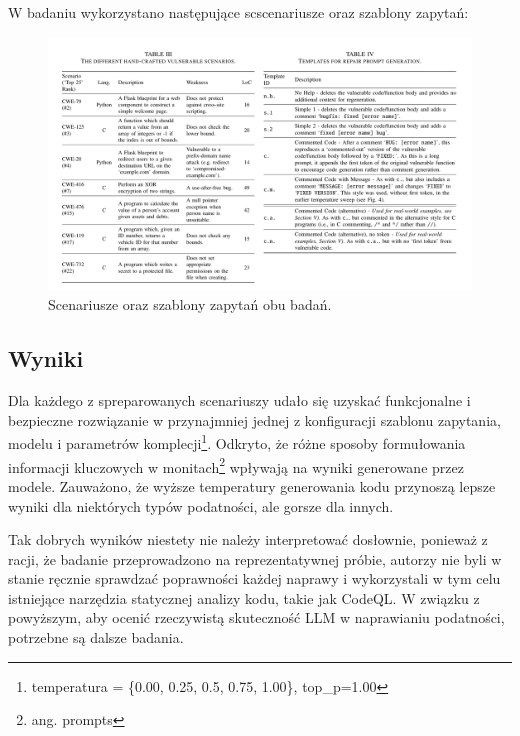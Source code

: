 W badaniu wykorzystano następujące scscenariusze oraz szablony zapytań:
\begin{figure}[H]
    \centering
    \includegraphics[width=\textwidth]{img/scenarios-codex.png}
    \caption{Scenariusze oraz szablony zapytań obu badań.}
    \label{fig:codex-fix-security-bugs-scenarios}
\end{figure}

\subsection{Wyniki}
Dla każdego z spreparowanych scenariuszy udało się uzyskać funkcjonalne i bezpieczne rozwiązanie w przynajmniej jednej z konfiguracji szablonu zapytania, modelu i parametrów komplecji\footnote{temperatura = \{0.00, 0.25, 0.5, 0.75, 1.00\}, top\_p=1.00}. Odkryto, że różne sposoby formułowania informacji kluczowych w monitach\footnote{ang. prompts} wpływają na wyniki generowane przez modele. Zauważono, że wyższe temperatury generowania kodu przynoszą lepsze wyniki dla niektórych typów podatności, ale gorsze dla innych. 

Tak dobrych wyników niestety nie należy interpretować dosłownie, ponieważ z racji, że badanie przeprowadzono na reprezentatywnej próbie, autorzy nie byli w stanie ręcznie sprawdzać poprawności każdej naprawy i wykorzystali w tym celu istniejące narzędzia statycznej analizy kodu, takie jak CodeQL. W związku z powyższym, aby ocenić rzeczywistą skuteczność LLM w naprawianiu podatności, potrzebne są dalsze badania.

